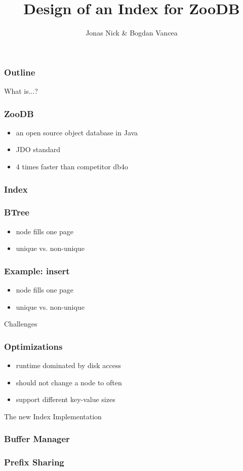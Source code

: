 \documentclass{beamer}
\title{Design of an Index for ZooDB}
\author{Jonas Nick \& Bogdan Vancea}
\begin{document}
  \frame{\titlepage}
  \begin{frame}
    \frametitle{Outline}
    \tableofcontents[hideallsubsections]
  \end{frame}

  \begin{section}{What is...?}
    \begin{frame}
      \frametitle{ZooDB}
      \begin{itemize}
        \item an open source object database in Java
        \item JDO standard
        \item 4 times faster than competitor db4o
      \end{itemize}

    \end{frame}
    \begin{frame}
      \frametitle{Index}
    \end{frame}
    \begin{frame}
      \frametitle{BTree}
        \begin{itemize}
          \item node fills one page
          \item unique vs. non-unique
        \end{itemize}
      \frametitle{Example: insert}
        \begin{itemize}
          \item node fills one page
          \item unique vs. non-unique
        \end{itemize}
    \end{frame}
  \end{section}

  \begin{section}{Challenges}
    \begin{frame}
      \frametitle{Optimizations}
        \begin{itemize}
          \item runtime dominated by disk access
          \item should not change a node to often
          \item support different key-value sizes
        \end{itemize}
    \end{frame}
  \end{section}

  \begin{section}{The new Index Implementation}
    \begin{frame}
      \frametitle{Buffer Manager}
    \end{frame}
    \begin{frame}
      \frametitle{Prefix Sharing}
    \end{frame}
  \end{section}
\end{document}
